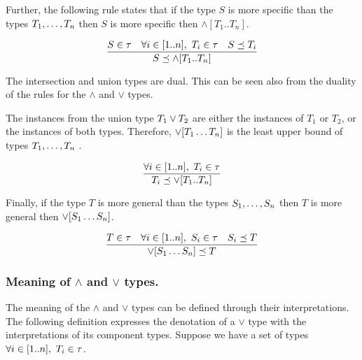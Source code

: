 \documentclass[runningheads]{llncs}
\newcommand{\memo}[1]{}
\begin{document}
Further, the following rule states that if the type $S$ is more
specific than the types $T_1,\ldots\/,T_n$ then $S$ is more specific
then $\land[T_1..T_n]$.

\memo{\begin{equation}
\dfrac{S,T_1,T_2\in\tau\quad S\preceq\/T_1\quad\/S\preceq\/\/T_2}
      {S\preceq\/T_1\land\/T_2}  
\end{equation}}

\begin{equation}
\label{rul:intsc-gather}
\dfrac{S\in\tau\quad\forall\/i\in[1..n],\ T_i\in\tau\quad\/S\preceq\/T_i}
      {S\preceq\land[T_1..\/T_n]}  
\end{equation} 

The intersection and union types are dual. This can be seen also from
the duality of the rules for the $\land$ and $\lor$ types.

The instances from the union type $T_1\lor\/T_2$ are either the
instances of $T_1$ or $T_2$, or the instances of both
types. Therefore, $\lor[T_1\ldots\/T_n]$ is the least upper bound of
types $T_1,\ldots,\/T_n$ \cite{Pierce1991}.

\memo{\begin{equation}
\dfrac{T_1,T_2\in\tau}
      {T_1\preceq\/T_1\lor\/T_2}
\end{equation}

\begin{equation}
\dfrac{T_1,T_2\in\tau}
      {T_2\preceq\/T_1\lor\/T_2}
\end{equation}}

\begin{equation}
\label{rul:lor-1}
\dfrac{\forall\/i\in[1..n],\ T_i\in\tau}
      {T_i\preceq\/\lor[T_1..\/T_n]}
\end{equation}

Finally, if the type $T$ is more general than the types
$S_1,\ldots,\/S_n$ then $T$ is more general then
$\lor[S_1\ldots\/S_n]$.

\memo{\begin{equation}
\dfrac{T,S_1,S_2\in\tau\quad S_1\preceq\/T\quad\/S_2\preceq\/\/T}
      {S_1\lor\/S_2\preceq\/T}  
\end{equation}}

\begin{equation}
\label{rul:lor-2}
\dfrac{T\in\tau\quad\forall\/i\in[1..n],\ S_i\in\tau\quad\/S_i\preceq\/T}
      {\lor[S_1\ldots\/S_n]\preceq\/T}  
\end{equation}


\subsubsection{Meaning of $\land$ and $\lor$ types.}
The meaning of the $\land$ and $\lor$ types can be defined through
their interpretations. The following definition expresses the
denotation of a $\lor$ type with the interpretations of its component
types. Suppose we have a set of types
$\forall\/i\in\/[1..n],\ T_i\in\tau$.
\end{document}
